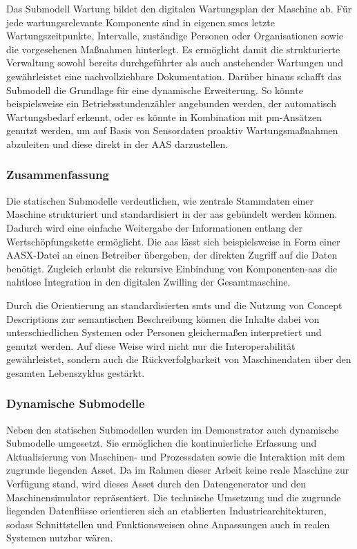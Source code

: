 Das Submodell Wartung bildet den digitalen Wartungsplan der Maschine ab. 
Für jede wartungsrelevante Komponente sind in eigenen \acsp{smc} letzte Wartungszeitpunkte, Intervalle, zuständige Personen oder Organisationen sowie die vorgesehenen Maßnahmen hinterlegt. 
Es ermöglicht damit die strukturierte Verwaltung sowohl bereits durchgeführter als auch anstehender Wartungen und gewährleistet eine nachvollziehbare Dokumentation. 
Darüber hinaus schafft das Submodell die Grundlage für eine dynamische Erweiterung. 
So könnte beispielsweise ein Betriebsstundenzähler angebunden werden, der automatisch Wartungsbedarf erkennt, oder es könnte in Kombination mit \acs{pm}-Ansätzen genutzt werden, um auf Basis von Sensordaten proaktiv Wartungsmaßnahmen abzuleiten und diese direkt in der AAS darzustellen. 

\subsubsection*{Zusammenfassung}
\vspace{-0.5em}

Die statischen Submodelle verdeutlichen, wie zentrale Stammdaten einer Maschine strukturiert und standardisiert in der \acs{aas} gebündelt werden können. 
Dadurch wird eine einfache Weitergabe der Informationen entlang der Wertschöpfungskette ermöglicht. 
Die \acs{aas} lässt sich beispielsweise in Form einer AASX-Datei an einen Betreiber übergeben, der direkten Zugriff auf die Daten benötigt.
Zugleich erlaubt die rekursive Einbindung von Komponenten-\acs{aas} die nahtlose Integration in den digitalen Zwilling der Gesamtmaschine. 

Durch die Orientierung an standardisierten \acsp{smt} und die Nutzung von Concept Descriptions zur semantischen Beschreibung können die Inhalte dabei von unterschiedlichen Systemen oder Personen gleichermaßen interpretiert und genutzt werden. 
Auf diese Weise wird nicht nur die Interoperabilität gewährleistet, sondern auch die Rückverfolgbarkeit von Maschinendaten über den gesamten Lebenszyklus gestärkt.

\newpage
\subsubsection{Dynamische Submodelle}
\label{sec:DynamischeSubmodelle}
Neben den statischen Submodellen wurden im Demonstrator auch dynamische Submodelle umgesetzt.
Sie ermöglichen die kontinuierliche Erfassung und Aktualisierung von Maschinen- und Prozessdaten sowie die Interaktion mit dem zugrunde liegenden Asset.
Da im Rahmen dieser Arbeit keine reale Maschine zur Verfügung stand, wird dieses Asset durch den Datengenerator und den Maschinensimulator repräsentiert.
Die technische Umsetzung und die zugrunde liegenden Datenflüsse orientieren sich an etablierten Industriearchitekturen, sodass Schnittstellen und Funktionsweisen ohne Anpassungen auch in realen Systemen nutzbar wären.

